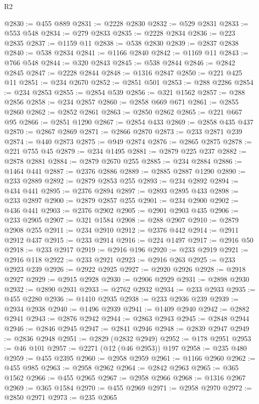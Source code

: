 \begin{lexlean}{R2}
\begin{coremodule}
@2830 := @455 @889
@2831 := @2228 @2830
@2832 := @529 @2831
@2833 := @553 @548
@2834 := @279 @2833
@2835 := @2228 @2834
@2836 := @223 @2835
@2837 := @1159 @11
@2838 := @538 @2830
@2839 := @2837 @2838
@2840 := @538 @2834
@2841 := @1166 @2840
@2842 := @1169 @11
@2843 := @766 @548
@2844 := @320 @2843
@2845 := @538 @2844
@2846 := @2842 @2845
@2847 := @2228 @2844
@2848 := @1316 @2847
@2850 := @221 @425 @11
@2851 := @234 @2670
@2852 := @2851 @501
@2853 := @288 @2286
@2854 := @234 @2853
@2855 := @2854 @539
@2856 := @321 @1562
@2857 := @288 @2856
@2858 := @234 @2857
@2860 := @2858 @669 @671
@2861 := @2855 @2860
@2862 := @2852 @2861
@2863 := @2850 @2862
@2865 := @221 @667 @95
@2866 := @2851 @1290
@2867 := @2854 @433
@2869 := @2858 @435 @437
@2870 := @2867 @2869
@2871 := @2866 @2870
@2873 := @233 @2871 @239
@2874 := @440 @2873
@2875 := @949 @2874
@2876 := @2865 @2875
@2878 := @221 @755 @45
@2879 := @234 @1495
@2881 := @2879 @225 @237
@2882 := @2878 @2881
@2884 := @2879 @2670 @255
@2885 := @234 @2884
@2886 := @1464 @441
@2887 := @2376 @2886
@2889 := @2885 @2887 @1290
@2890 := @233 @2889
@2892 := @2879 @2853 @255
@2893 := @234 @2892
@2894 := @434 @441
@2895 := @2376 @2894
@2897 := @2893 @2895 @433
@2898 := @233 @2897
@2900 := @2879 @2857 @255
@2901 := @234 @2900
@2902 := @436 @441
@2903 := @2376 @2902
@2905 := @2901 @2903 @435
@2906 := @233 @2905
@2907 := @321 @1584
@2908 := @288 @2907
@2910 := @2879 @2908 @255
@2911 := @234 @2910
@2912 := @2376 @442
@2914 := @2911 @2912 @437
@2915 := @233 @2914
@2916 := @224 @1497
@2917 := @2916 @50
@2918 := @233 @2917
@2919 := @2916 @196
@2920 := @233 @2919
@2921 := @2916 @118
@2922 := @233 @2921
@2923 := @2916 @263
@2925 := @233 @2923 @239
@2926 := @2922 @2925
@2927 := @2920 @2926
@2928 := @2918 @2927
@2929 := @2915 @2928
@2930 := @2906 @2929
@2931 := @2898 @2930
@2932 := @2890 @2931
@2933 := @2762 @2932
@2934 := @233 @2933
@2935 := @455 @2280
@2936 := @1410 @2935
@2938 := @233 @2936 @239
@2939 := @2934 @2938
@2940 := @1496 @2939
@2941 := @1409 @2940
@2942 := @2882 @2941
@2943 := @2876 @2942
@2944 := @2863 @2943
@2945 := @2848 @2944
@2946 := @2846 @2945
@2947 := @2841 @2946
@2948 := @2839 @2947
@2949 := @2836 @2948
@2951 := @2829 (@2832 @2949)
@2952 := @178 @2951
@2953 := @46 @101
@2957 := @2271 (@12 (@46 @2953)) @197
@2958 := @235 @480
@2959 := @455 @2395
@2960 := @2958 @2959
@2961 := @1166 @2960
@2962 := @455 @985
@2963 := @2958 @2962
@2964 := @2842 @2963
@2965 := @365 @1562
@2966 := @455 @2965
@2967 := @2958 @2966
@2968 := @1316 @2967
@2969 := @365 @1584
@2970 := @455 @2969
@2971 := @2958 @2970
@2972 := @2850 @2971
@2973 := @235 @2065

\end{coremodule}
\end{lexlean}
